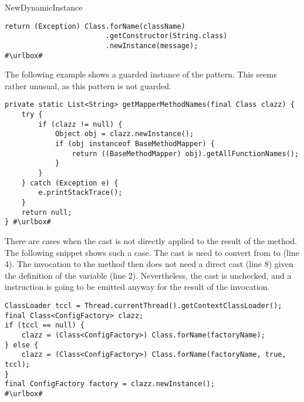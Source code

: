 \begin{pattern}{NewDynamicInstance}
\begin{verbatim}
return (Exception) Class.forName(className)
                        .getConstructor(String.class)
                        .newInstance(message);
#\urlbox#
\end{verbatim}

The following example%
\def\urlvar{http://bit.ly/alibaba_LuaViewSDK_2HC33xg}
shows a guarded instance of the \thisp{} pattern.
This seems rather unusual, as this pattern is not guarded.

\begin{verbatim}
private static List<String> getMapperMethodNames(final Class clazz) {
    try {
        if (clazz != null) {
            Object obj = clazz.newInstance();
            if (obj instanceof BaseMethodMapper) {
                return ((BaseMethodMapper) obj).getAllFunctionNames();
            }
        }
    } catch (Exception e) {
        e.printStackTrace();
    }
    return null;
} #\urlbox#
\end{verbatim}

There are cases when the cast is not directly applied to the result of the  method.
The following snippet shows such a case.
The cast is used to convert from  to  (line 4).
The invocation to the  method then does not need a direct cast (line 8) given the definition of the  variable (line 2).
Nevertheless, the cast is unchecked, and a  instruction is going to be emitted anyway for the result of the  invocation.

\def\urlvar{http://bit.ly/pac4j_pac4j_2HJtXUn}
\begin{verbatim}
ClassLoader tccl = Thread.currentThread().getContextClassLoader();
final Class<ConfigFactory> clazz;
if (tccl == null) {
    clazz = (Class<ConfigFactory>) Class.forName(factoryName);
} else {
    clazz = (Class<ConfigFactory>) Class.forName(factoryName, true, tccl);
}
final ConfigFactory factory = clazz.newInstance();
#\urlbox#
\end{verbatim}



\end{pattern}
